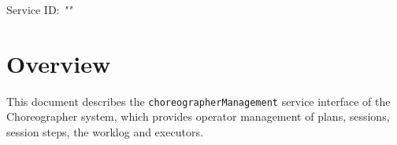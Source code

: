 \documentclass[a4paper]{arrowhead}
\begin{document}
\sloppy

\ArrowheadSetup

\begin{center}
  \vspace*{1cm}
  \huge{\arrowtitle}

  \vspace*{0.2cm}
  \LARGE{\arrowtype}
  \vspace*{1cm}

  \Large{Service ID: \textit{"\arrowid"}}

  \vspace*{\fill}


  \vspace*{1cm}
  \vspace*{\fill}

  \begin{abstract}
    This document describes the HTTP/1.1 protocol with TLS payload security and JSON payload encoding variant of the \texttt{choreographer\allowbreak{}Management} service of the Choreographer system.
  \end{abstract}

  \vspace*{1cm}
\end{center}

\newpage

\tableofcontents
\newpage

\section{Overview}
\label{sec:overview}

This document describes the \texttt{choreographer\allowbreak{}Management} service interface of the Choreographer system, which provides operator management of plans, sessions, session steps, the worklog and executors.
\end{document}
